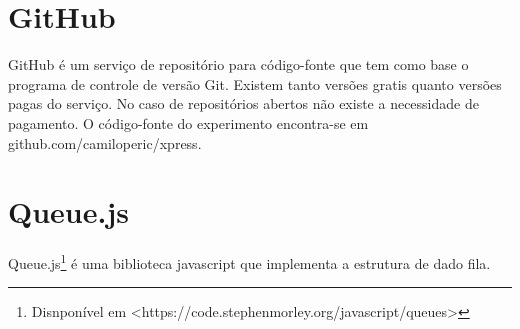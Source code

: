 \section{GitHub}
GitHub é um serviço de repositório para código-fonte que tem como base o programa de controle de versão Git. Existem tanto versões gratis quanto versões pagas do serviço. No caso de repositórios abertos não existe a necessidade de pagamento. O código-fonte do experimento encontra-se em github.com/camiloperic/xpress.

\section{Queue.js}
Queue.js\footnote{Disnponível em <https://code.stephenmorley.org/javascript/queues>} é uma biblioteca javascript que implementa a estrutura de dado fila.
